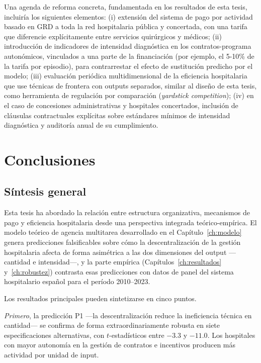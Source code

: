 \documentclass[12pt, a4paper, twoside, openright]{book}
\theoremstyle{plain}
\theoremstyle{definition}
\theoremstyle{remark}
\begin{document}
Una agenda de reforma concreta, fundamentada en los resultados de esta tesis, incluiría los siguientes elementos: (i) extensión del sistema de pago por actividad basado en GRD a toda la red hospitalaria pública y concertada, con una tarifa que diferencie explícitamente entre servicios quirúrgicos y médicos; (ii) introducción de indicadores de intensidad diagnóstica en los contratos-programa autonómicos, vinculados a una parte de la financiación (por ejemplo, el 5-10\% de la tarifa por episodio), para contrarrestar el efecto de sustitución predicho por el modelo; (iii) evaluación periódica multidimensional de la eficiencia hospitalaria que use técnicas de frontera con outputs separados, similar al diseño de esta tesis, como herramienta de regulación por comparación (\textit{yardstick competition}); (iv) en el caso de concesiones administrativas y hospitales concertados, inclusión de cláusulas contractuales explícitas sobre estándares mínimos de intensidad diagnóstica y auditoría anual de su cumplimiento.



\chapter{Conclusiones}
\label{ch:conclusiones}

\section{Síntesis general}

Esta tesis ha abordado la relación entre estructura organizativa, mecanismos de pago y eficiencia hospitalaria desde una perspectiva integrada teórico-empírica. El modelo teórico de agencia multitarea desarrollado en el Capítulo~\ref{ch:modelo} genera predicciones falsificables sobre cómo la descentralización de la gestión hospitalaria afecta de forma asimétrica a las dos dimensiones del output ---cantidad e intensidad---, y la parte empírica (Capítulos~\ref{ch:resultados} y~\ref{ch:robustez}) contrasta esas predicciones con datos de panel del sistema hospitalario español para el período 2010--2023.

Los resultados principales pueden sintetizarse en cinco puntos.

\textit{Primero}, la predicción P1 ---la descentralización reduce la ineficiencia técnica en cantidad--- se confirma de forma extraordinariamente robusta en siete especificaciones alternativas, con $t$-estadísticos entre $-3.3$ y $-11.0$. Los hospitales con mayor autonomía en la gestión de contratos e incentivos producen más actividad por unidad de input.
\end{document}

